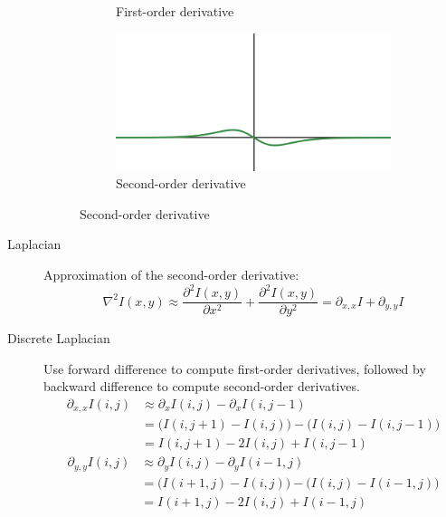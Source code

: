 \begin{description}
\begin{figure}[H]
\begin{subfigure}{0.3\linewidth}
                \caption{First-order derivative}
            \end{subfigure}
            \begin{subfigure}{0.3\linewidth}
                \centering
                \includegraphics[width=\linewidth]{./img/zero_crossing_example3.png}
                \caption{Second-order derivative}
            \end{subfigure}
        \end{figure}


    \item[Laplacian] 
        Approximation of the second-order derivative:
        \[ \nabla^2 I(x, y) \approx \frac{\partial^2 I(x, y)}{\partial x^2} + \frac{\partial^2 I(x, y)}{\partial y^2} = \partial_{x,x} I + \partial_{y, y} I \]


    \item[Discrete Laplacian] 
        Use forward difference to compute first-order derivatives,
        followed by backward difference to compute second-order derivatives.
        \[
            \begin{split}
                \partial_{x,x} I(i, j) &\approx \partial_x I(i, j) - \partial_x I(i, j-1) \\
                    &= \big ( I(i, j+1) - I(i, j) \big) - \big ( I(i, j) - I(i, j-1) \big) \\
                    &= I(i, j+1) - 2I(i, j) + I(i, j-1)
            \end{split}            
        \]
        \[
            \begin{split}
                \partial_{y,y} I(i, j) &\approx \partial_y I(i, j) - \partial_y I(i-1, j) \\
                    &= \big ( I(i+1, j) - I(i, j) \big) - \big ( I(i, j) - I(i-1, j) \big) \\
                    &= I(i+1, j) - 2I(i, j) + I(i-1, j)
            \end{split}            
        \]


\end{description}
